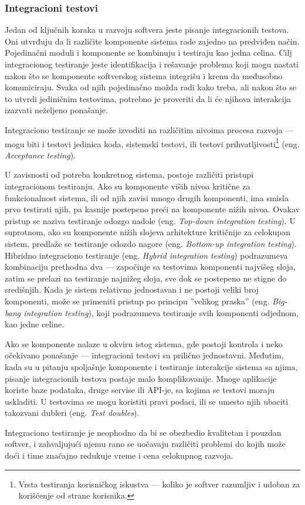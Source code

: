 \documentclass[12pt,oneside]{memoir}
\begin{document}
\subsubsection{Integracioni testovi}
\label{sec:integration}
\par Jedan od ključnih koraka u razvoju softvera jeste pisanje integracionih testova. Oni utvrđuju da li različite komponente sistema rade zajedno na predviđen način. Pojedinačni moduli i komponente se kombinuju i testiraju kao jedna celina. Cilj integracionog testiranje jeste identifikacija i rešavanje problema koji mogu nastati nakon što se komponente softverskog sistema integrišu i krenu da međusobno komuniciraju. Svaka od njih pojedinačno možda radi kako treba, ali nakon što se to utvrdi jediničnim testovima, potrebno je proveriti da li će njihova interakcija izazvati neželjeno ponašanje. 
\par Integraciono testiranje se može izvoditi na različitim nivoima procesa razvoja --- mogu biti i testovi jedinica koda, sistemski testovi, ili testovi prihvatljivosti\footnote{Vrsta testiranja korisničkog iskustva --- koliko je softver razumljiv i udoban za korišćenje od strane korisnika.} (eng. \textit{Acceptance testing}).
\par U zavisnosti od potreba konkretnog sistema, postoje različiti pristupi integracionom testiranju. Ako su komponente viših nivoa kritične za funkcionalnost sistema, ili od njih zavisi mnogo drugih komponenti, ima smisla prvo testirati njih, pa kasnije postepeno preći na komponente nižih nivoa. Ovakav pristup se naziva testiranje odozgo nadole (eng. \emph{Top-down integration testing}). U suprotnom, ako su komponente nižih slojeva arhitekture kritičnije za celokupan sistem, predlaže se testiranje odozdo nagore (eng. \emph{Bottom-up integration testing}). Hibridno integraciono testiranje (eng. \emph{Hybrid integration testing}) podrazumeva kombinaciju prethodna dva --- započinje sa testovima komponenti najvišeg sloja, zatim se prelazi na testiranje najnižeg sloja, sve dok se postepeno ne stigne do središnjih. Kada je sistem relativno jednostavan i ne postoji veliki broj komponenti, može se primeniti pristup po principu ''velikog praska'' (eng. \emph{Big-bang integration testing}), koji podrazumeva testiranje svih komponenti odjednom, kao jedne celine. 
\par Ako se komponente nalaze u okviru istog sistema, gde postoji kontrola i neko očekivano ponašanje --- integracioni testovi su prilično jednostavni. Međutim, kada su u pitanju spoljašnje komponente i testiranje interakcije sistema sa njima, pisanje integracionih testova postaje malo komplikovanije. Mnoge aplikacije koriste baze podataka, druge servise ili API-je, sa kojima se testovi moraju uskladiti. U testovima se mogu koristiti pravi podaci, ili se umesto njih ubaciti takozvani dubleri (eng. \textit{Test doubles}).
\par Integraciono testiranje je neophodno da bi se obezbedio kvalitetan i pouzdan softver, i zahvaljujući njemu rano se uočavaju različiti problemi do kojih može doći i time značajno redukuje vreme i cena celokupnog razvoja. 
\end{document}
